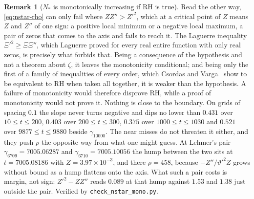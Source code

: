\documentclass[11pt]{article}
\theoremstyle{definition}
\newtheorem{remark}[theorem]{Remark}
\begin{document}
\begin{remark}[$N_{\ast}$ is monotonically increasing if RH is true]
Read the other way, \eqref{eq:nstar-rho} can only fail where $ZZ''>Z'^2$, which
at a critical point of $Z$ means $Z$ and $Z''$ of one sign: a positive local
minimum or a negative local maximum, a pair of zeros that comes to the axis and
fails to reach it. The Laguerre inequality $\Xi'^2\geq\Xi\Xi''$, which Laguerre
proved for every real entire function with only real zeros, is precisely what
forbids that. Being a consequence of the hypothesis and not a theorem about
$\zeta$, it leaves the monotonicity conditional; and being only the first of a
family of inequalities of every order, which Csordas and
Varga~\cite{CsordasVarga1990} show to be equivalent to RH when taken all
together, it is weaker than the hypothesis. A failure of monotonicity would
therefore disprove RH, while a proof of monotonicity would not prove it. Nothing
is close to the boundary. On grids of spacing $0.1$ the slope never turns negative
and dips no lower than $0.431$ over $10\leq t\leq200$, $0.403$ over
$200\leq t\leq300$, $0.375$ over $1000\leq t\leq1030$ and $0.521$ over
$9877\leq t\leq9880$ beside $\gamma_{10000}$. The near misses do not threaten it
either, and they push $\rho$ the opposite way from what one might guess. At
Lehmer's pair~\cite{Lehmer1956} $\gamma_{6709}=7005.06287$ and
$\gamma_{6710}=7005.10056$ the hump between the two sits at $t=7005.08186$ with
$Z=3.97\times10^{-3}$, and there $\rho=458$, because $-Z''/\vartheta'^2Z$ grows
without bound as a hump flattens onto the axis. What such a pair costs is
margin, not sign: $Z'^2-ZZ''$ reads $0.089$ at that hump against $1.53$ and
$1.38$ just outside the pair. Verified by \texttt{check\_nstar\_mono.py}.
\end{remark}
\end{document}
